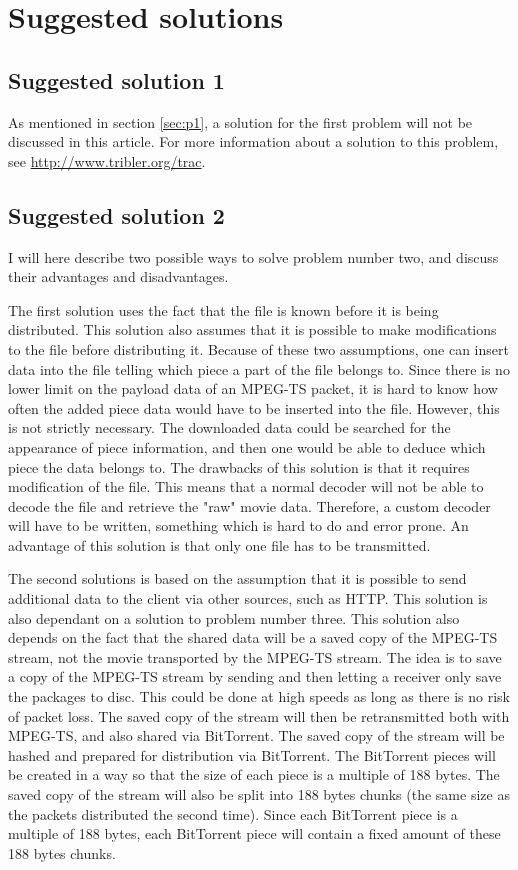 \documentclass[11pt,oneside,a4paper,onecolumn]{article}
\begin{document}
\section{Suggested solutions}
\subsection{Suggested solution 1}
As mentioned in section \ref{sec:p1}, a solution for the first problem will not be discussed in this article.
For more information about a solution to this problem, see \url{http://www.tribler.org/trac}.

\subsection{Suggested solution 2}
I will here describe two possible ways to solve problem number two, 
and discuss their advantages and disadvantages.

The first solution uses the fact that the file is known before it is being distributed. 
This solution also assumes that it is possible to make modifications to the file before 
distributing it. Because of these two assumptions, one can insert data into the file 
telling which piece a part of the file belongs to. Since there is no lower limit on 
the payload data of an MPEG-TS packet, it is hard to know how often the added piece data would 
have to be inserted into the file. However, this is not strictly necessary. The downloaded data 
could be searched for the appearance of piece information, and then one would be able to deduce
which piece the data belongs to. The drawbacks of this solution is that it requires modification of the file. 
This means that a normal decoder will not be able to decode the file and retrieve the "raw" 
movie data. Therefore, a custom decoder will have to be written, something which is hard to do 
and error prone. An advantage of this solution is that only one file has to be transmitted.

The second solutions is based on the assumption that it is possible to send additional data to 
the client via other sources, such as HTTP. This solution is also dependant on a solution to 
problem number three. This solution also depends on the fact that the shared data will be a 
saved copy of the MPEG-TS stream, not the movie transported by the MPEG-TS stream.
The idea is to save a copy of the MPEG-TS stream by sending and then letting a receiver only 
save the packages to disc. This could be done at high speeds as long as there is no risk of packet loss.
The saved copy of the stream will then be retransmitted both with MPEG-TS, and also shared via 
BitTorrent. The saved copy of the stream will be hashed and prepared for distribution via BitTorrent.
The BitTorrent pieces will be created in a way so that the size of each piece is a multiple of 188 bytes.
The saved copy of the stream will also be split into 188 bytes chunks (the same size as the packets distributed the second time).
Since each BitTorrent piece is a multiple of 188 bytes, 
each BitTorrent piece will contain a fixed amount of these 188 bytes chunks. 
\end{document}
